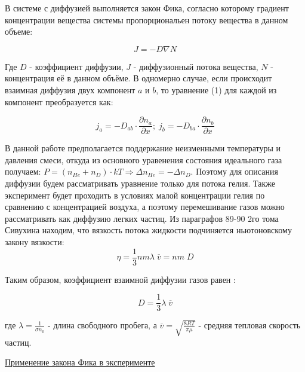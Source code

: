 \documentclass{article}
\begin{document}
В системе с диффузией выполняется закон Фика, согласно которому градиент концентрации вещества системы пропорциональен потоку вещества в данном объеме:

\begin{equation}
    J = - D \nabla N
\end{equation}

Где \(D\) - коэффициент диффузии, \(J\) - диффузионный потока вещества, \(N\) - концентрация её в данном объёме. В одномерно случае, если происходит взаимная диффузия двух компонент \(a\) и \(b\), то уравнение (1) для каждой из компонент преобразуется как:

\begin{equation}
    j_{a} = - D_{ab} \cdot \frac{\partial n_{a}}{\partial x}; \;
    j_{b} = - D_{ba} \cdot \frac{\partial n_{b}}{\partial x}
\end{equation}

В данной работе предполагается поддержание неизменными температуры и давления смеси, откуда из основного уравенения состояния идеального газа получаем: \(P = (n_{He} + n_{D})\cdot kT \Rightarrow \Delta n_{He} = - \Delta n_{D}\). Поэтому для описания диффузии будем рассматривать уравнение только для потока гелия. Также эксперимент будет проходить в условиях малой концентрации гелия по сравнению с концентрацией воздуха, а поэтому перемешивание газов можно рассматривать как диффузию легких частиц. Из параграфов 89-90 2го тома Сивухина находим, что вязкость потока жидкости подчиняется ньютоновскому закону вязкости:
\begin{equation}
    \eta = \frac{1}{3} nm\lambda\;\overline{v} = nm\; D
\end{equation}

Таким образом, коэффициент взаимной диффузии газов равен :

\begin{equation}
    D = \frac{1}{3} \lambda\;\overline{v}
\end{equation}

где \(\lambda = \frac{1}{\sigma n_{0}}\) - длина свободного пробега, а \(\overline{v} = \sqrt {\frac{8RT}{\pi \mu}}\) - средняя тепловая скорость частиц.

\begin{center}
    \raggedright
    {
        \large{\underline{Применение закона Фика в эксперименте}}
    }
\end{center}
\end{document}
